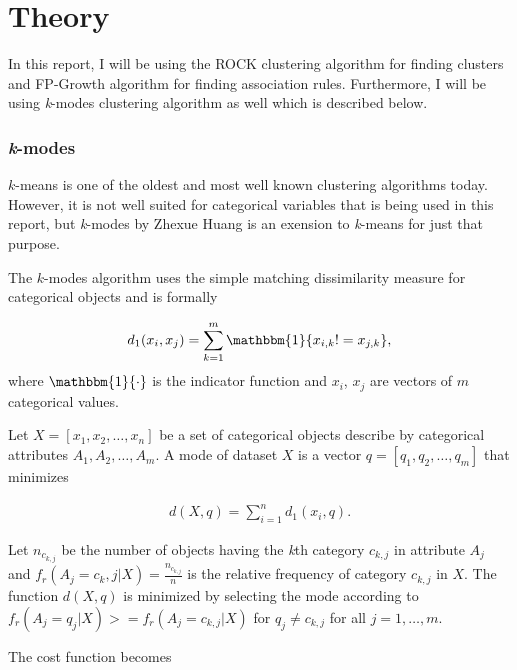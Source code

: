 \documentclass[result.tex]{subfiles}
\begin{document}
\section*{\centering Theory}

In this report, I will be using the ROCK clustering algorithm \cite{guha2000rock} for finding clusters and FP-Growth algorithm \cite{han2000mining} for finding association rules. Furthermore, I will be using \textit{k}-modes clustering algorithm as well which is described below.

\subsubsection*{\textit{k}-modes}

$k$-means is one of the oldest and most well known clustering algorithms today. However, it is not well suited for categorical variables that is being used in this report, but \textit{k}-modes by Zhexue Huang \cite{huang1998extensions} is an exension to \textit{k}-means for just that purpose.

The $k$-modes algorithm uses the simple matching dissimilarity measure for categorical objects and is formally

\begin{align*}
d_1(x_i, x_j) = \sum_{k=1}^{m}  \mathbbm{1} \{ x_{i,k} != x_{j,k} \},
\end{align*}
where $\mathbbm{1} \{ \cdot \}$ is the indicator function and $x_i$, $x_j$ are vectors of $m$ categorical values.

Let $X = \left[ x_1, x_2, \ldots, x_n \right]$ be a set of categorical objects describe by categorical attributes $A_1, A_2, \ldots, A_m$. A mode of dataset $X$ is a vector $q = \left[ q_1, q_2, \ldots, q_m \right]$ that minimizes

\begin{align*}
d(X, q) = \sum_{i=1}^{n} d_1(x_i, q).
\end{align*}

Let $n_{c_{k, j}}$ be the number of objects having the \textit{k}th category $c_{k,j}$ in attribute $A_j$ and $f_r(A_j = c_k,j | X) = \frac{n_{c_{k,j}}}{n}$ is the relative frequency of category $c_{k,j}$ in $X$. The function $d(X, q)$ is minimized by selecting the mode according to $f_r(A_j = q_j | X) >= f_r(A_j = c_{k,j} | X)$ for $q_j \neq c_{k,j}$ for all $j = 1, \ldots, m$.

The cost function becomes
\end{document}

